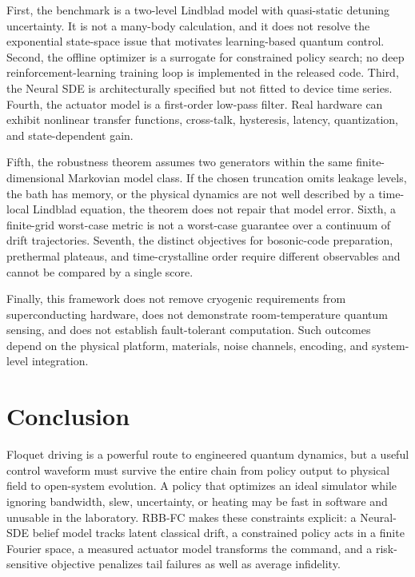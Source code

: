 \documentclass[10pt,twoside]{article}
\begin{document}
First, the benchmark is a two-level Lindblad model with quasi-static detuning uncertainty. It is not a many-body calculation, and it does not resolve the exponential state-space issue that motivates learning-based quantum control. Second, the offline optimizer is a surrogate for constrained policy search; no deep reinforcement-learning training loop is implemented in the released code. Third, the Neural SDE is architecturally specified but not fitted to device time series. Fourth, the actuator model is a first-order low-pass filter. Real hardware can exhibit nonlinear transfer functions, cross-talk, hysteresis, latency, quantization, and state-dependent gain.

Fifth, the robustness theorem assumes two generators within the same finite-dimensional Markovian model class. If the chosen truncation omits leakage levels, the bath has memory, or the physical dynamics are not well described by a time-local Lindblad equation, the theorem does not repair that model error. Sixth, a finite-grid worst-case metric is not a worst-case guarantee over a continuum of drift trajectories. Seventh, the distinct objectives for bosonic-code preparation, prethermal plateaus, and time-crystalline order require different observables and cannot be compared by a single score.

Finally, this framework does not remove cryogenic requirements from superconducting hardware, does not demonstrate room-temperature quantum sensing, and does not establish fault-tolerant computation. Such outcomes depend on the physical platform, materials, noise channels, encoding, and system-level integration.

\section{Conclusion}

Floquet driving is a powerful route to engineered quantum dynamics, but a useful control waveform must survive the entire chain from policy output to physical field to open-system evolution. A policy that optimizes an ideal simulator while ignoring bandwidth, slew, uncertainty, or heating may be fast in software and unusable in the laboratory. RBB-FC makes these constraints explicit: a Neural-SDE belief model tracks latent classical drift, a constrained policy acts in a finite Fourier space, a measured actuator model transforms the command, and a risk-sensitive objective penalizes tail failures as well as average infidelity.
\end{document}
